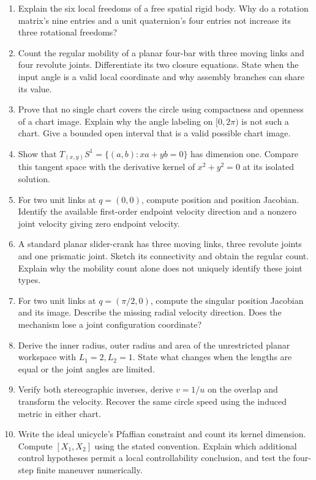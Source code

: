 \begin{enumerate}
\item\label{ex:ch3_1} Explain the six local freedoms of a free spatial rigid body. Why do a rotation matrix's nine entries and a unit quaternion's four entries not increase its three rotational freedoms?
\item\label{ex:ch3_2} Count the regular mobility of a planar four-bar with three moving links and four revolute joints. Differentiate its two closure equations. State when the input angle is a valid local coordinate and why assembly branches can share its value.
\item\label{ex:ch3_3} Prove that no single chart covers the circle using compactness and openness of a chart image. Explain why the angle labeling on $[0,2\pi)$ is not such a chart. Give a bounded open interval that is a valid possible chart image.
\item\label{ex:ch3_4} Show that $T_{(x,y)}S^1=\{(a,b):xa+yb=0\}$ has dimension one. Compare this tangent space with the derivative kernel of $x^2+y^2=0$ at its isolated solution.
\item\label{ex:ch3_5} For two unit links at $q=(0,0)$, compute position and position Jacobian. Identify the available first-order endpoint velocity direction and a nonzero joint velocity giving zero endpoint velocity.
\item\label{ex:ch3_6} A standard planar slider-crank has three moving links, three revolute joints and one prismatic joint. Sketch its connectivity and obtain the regular count. Explain why the mobility count alone does not uniquely identify these joint types.
\item\label{ex:ch3_7} For two unit links at $q=(\pi/2,0)$, compute the singular position Jacobian and its image. Describe the missing radial velocity direction. Does the mechanism lose a joint configuration coordinate?
\item\label{ex:ch3_8} Derive the inner radius, outer radius and area of the unrestricted planar workspace with $L_1=2,L_2=1$. State what changes when the lengths are equal or the joint angles are limited.
\item\label{ex:ch3_9} Verify both stereographic inverses, derive $v=1/u$ on the overlap and transform the velocity. Recover the same circle speed using the induced metric in either chart.
\item\label{ex:ch3_10} Write the ideal unicycle's Pfaffian constraint and count its kernel dimension. Compute $[X_1,X_2]$ using the stated convention. Explain which additional control hypotheses permit a local controllability conclusion, and test the four-step finite maneuver numerically.

\end{enumerate}
